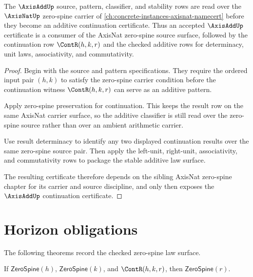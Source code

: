 \begin{theorem}
\label{thm:axisadd-axisnat-sibling-dependency}
The $\AxisAddUp$ source, pattern, classifier, and stability rows are read over the $\AxisNatUp$ zero-spine carrier of \autoref{ch:concrete-instances-axisnat-namecert} before they become an additive continuation certificate. Thus an accepted $\AxisAddUp$ certificate is a consumer of the AxisNat zero-spine source surface, followed by the continuation row $\ContR(h,k,r)$ and the checked additive rows for determinacy, unit laws, associativity, and commutativity.
\end{theorem}
\begin{proof}
Begin with the source and pattern specifications. They require the ordered input pair $(h,k)$ to satisfy the zero-spine carrier condition before the continuation witness $\ContR(h,k,r)$ can serve as an additive pattern.

Apply zero-spine preservation for continuation. This keeps the result row on the same AxisNat carrier surface, so the additive classifier is still read over the zero-spine source rather than over an ambient arithmetic carrier.

Use result determinacy to identify any two displayed continuation results over the same zero-spine source pair. Then apply the left-unit, right-unit, associativity, and commutativity rows to package the stable additive law surface.

The resulting certificate therefore depends on the sibling AxisNat zero-spine chapter for its carrier and source discipline, and only then exposes the $\AxisAddUp$ continuation certificate.
\end{proof}

\section{Horizon obligations}

The following theorems record the checked zero-spine law surface.

\begin{theorem}
\label{thm:axisadd-cont-preserves-zerospine}
If \(\mathsf{ZeroSpine}(h)\), \(\mathsf{ZeroSpine}(k)\), and \(\ContR(h, k, r)\), then \(\mathsf{ZeroSpine}(r)\).
\end{theorem}

